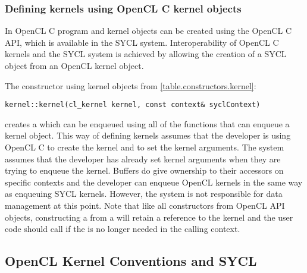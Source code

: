 

\subsubsection{Defining kernels using OpenCL C kernel objects}
\label{sec:interfaces.kernels.opencl.objects}

In OpenCL C \cite{opencl12} program and kernel objects can be created
using the OpenCL C API, which is available in the SYCL
system. Interoperability of OpenCL C kernels and the SYCL system is
achieved by allowing the creation of a SYCL  object from
an OpenCL \gls{kernel} object.

The constructor using kernel objects from \ref{table.constructors.kernel}:
\begin{lstlisting}[style=nonumbers]
kernel::kernel(cl_kernel kernel, const context& syclContext)
\end{lstlisting}

creates a  which can be enqueued using
all of the  functions that can enqueue a kernel object.
This way of defining kernels assumes that
the developer is using OpenCL C to create the kernel and to set the
kernel arguments. The system assumes that the developer has already
set kernel arguments when they are trying to enqueue the
kernel. Buffers do give ownership to their accessors on specific
contexts and the developer can enqueue OpenCL kernels in the same way
as enqueuing SYCL kernels.  However, the system is not responsible for
data management at this point.  Note that like all constructors from
OpenCL API objects, constructing a  from
a  will retain a reference to the kernel and the
user code should call  if the
 is no longer needed in the calling context.


\subsection{OpenCL Kernel Conventions and SYCL}
\label{sec:opencl_kern_conventions_and_sycl}

